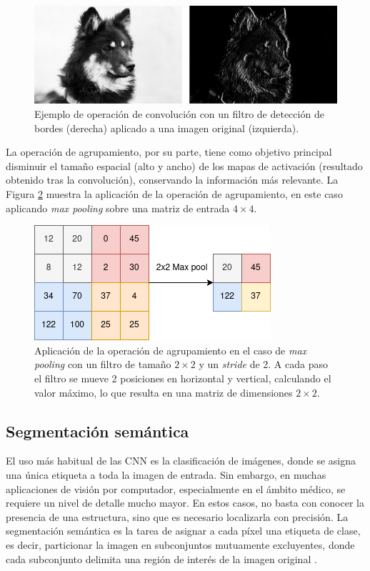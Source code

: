 \documentclass[../main.tex]{subfiles}
\begin{document}
\begin{figure}
    \centering
    \includegraphics[width=\textwidth]{imgs/fundamentos/conv_operation.png}
    \caption{Ejemplo de operación de convolución con un filtro de detección de bordes (derecha) aplicado a una imagen original (izquierda).}
    \label{fig:cnn_bordes}
\end{figure}

La operación de agrupamiento, por su parte, tiene como objetivo principal disminuir el tamaño espacial (alto y ancho) de los mapas de activación (resultado obtenido tras la convolución), conservando la información más relevante. La Figura \ref{fig:con_operation} muestra la aplicación de la operación de agrupamiento, en este caso aplicando \textit{max pooling} sobre una matriz de entrada $4 \times 4$.

\begin{figure}
    \centering
    \includegraphics[width=0.5\linewidth]{imgs/fundamentos/max_pooling.drawio.png}
    \caption{Aplicación de la operación de agrupamiento en el caso de \textit{max pooling} con un filtro de tamaño $2 \times 2$ y un \textit{stride} de 2. A cada paso el filtro se mueve 2 posiciones en horizontal y vertical, calculando el valor máximo, lo que resulta en una matriz de dimensiones $2 \times 2$.}
    \label{fig:con_operation}
\end{figure}

\subsection{Segmentación semántica}
El uso más habitual de las CNN es la clasificación de imágenes, donde se asigna una única etiqueta a toda la imagen de entrada. Sin embargo, en muchas aplicaciones de visión por computador, especialmente en el ámbito médico, se requiere un nivel de detalle mucho mayor. En estos casos, no basta con conocer la presencia de una estructura, sino que es necesario localizarla con precisión. La segmentación semántica es la tarea de asignar a cada píxel una etiqueta de clase, es decir, particionar la imagen en subconjuntos mutuamente excluyentes, donde cada subconjunto delimita una región de interés de la imagen original \cite{HAO2020302}.
\end{document}
